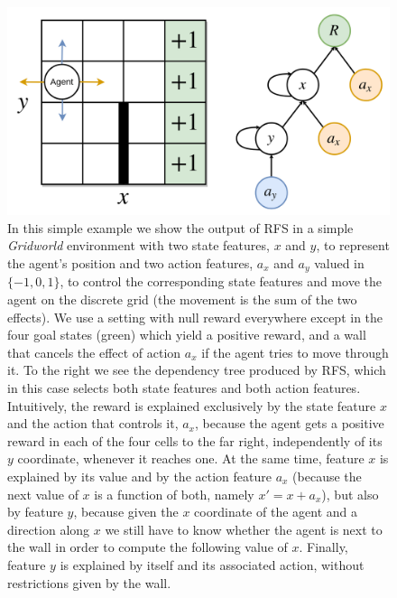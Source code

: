 \begin{figure}
    \includegraphics[width=\textwidth]{pictures/rfs_grid}
    \centering
    \caption[RFS on \textit{Gridworld}]{In this simple example we show the 
	    output of RFS in a simple \textit{Gridworld} environment with two 
	    state features, $x$ and $y$, to represent the agent's position and 
	    two action features, $a_x$ and $a_y$ valued in $\{-1, 0, 1\}$, to 
	    control the corresponding state features and move the agent on the 
	    discrete grid (the movement is the sum of the two effects). We use 
	    a setting with null reward everywhere except in the four goal states
	    (green) which yield a positive reward, and a wall that cancels the 
	    effect of action $a_x$ if the agent tries to move through it.
	    To the right we see the dependency tree produced by RFS, which in 
	    this case selects both state features and both action features. 
	    Intuitively, the reward is explained exclusively by the state 
	    feature $x$ and the action that controls it, $a_x$, because the 
	    agent gets a positive reward in each of the four cells to the far 
	    right, independently of its $y$ coordinate, whenever it reaches one. 
	    At the same time, feature $x$ is explained by its value and by the 
	    action feature $a_x$ (because the next value of $x$ is a function of
	    both, namely $x' = x + a_x$), but also by feature $y$, because 
	    given the $x$ coordinate of the agent and a direction along $x$ we 
	    still have to know whether the agent is next to the wall in order to 
	    compute the following value of $x$. Finally, feature $y$ is 
	    explained by itself and its associated action, without restrictions 
	    given by the wall.}
    \label{f:rfs_grid}
\end{figure}
%

